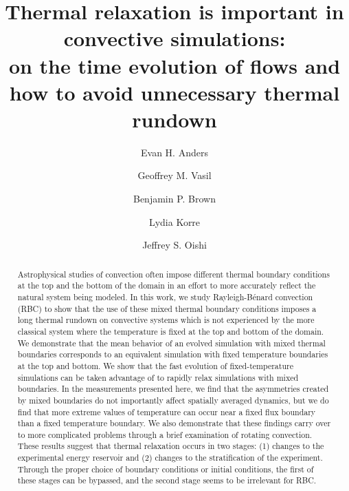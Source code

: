 \documentclass[aps, pre, onecolumn, nofootinbib, notitlepage, groupedaddress, amsfonts, amssymb, amsmath, longbibliography, superscriptaddress]{revtex4-1}
\newcommand{\RB}{Rayleigh-B\'{e}nard }
\begin{document}
\author{Evan H. Anders}
\author{Geoffrey M. Vasil}
\author{Benjamin P. Brown}
\author{Lydia Korre}
\author{Jeffrey S. Oishi}

\title{Thermal relaxation is important in convective simulations: \\
on the time evolution of flows and how to avoid unnecessary thermal rundown}

\begin{abstract}
Astrophysical studies of convection often impose different thermal boundary conditions at the top and the bottom of the domain in an effort to more accurately reflect the natural system being modeled.
In this work, we study \RB convection (RBC) to show that the use of these mixed thermal boundary conditions imposes a long thermal rundown on convective systems which is not experienced by the more classical system where the temperature is fixed at the top and bottom of the domain.
We demonstrate that the mean behavior of an evolved simulation with mixed thermal boundaries corresponds to an equivalent simulation with fixed temperature boundaries at the top and bottom.
We show that the fast evolution of fixed-temperature simulations can be taken advantage of to rapidly relax simulations with mixed boundaries.
In the measurements presented here, we find that the asymmetries created by mixed boundaries do not importantly affect spatially averaged dynamics, but we do find that more extreme values of temperature can occur near a fixed flux boundary than a fixed temperature boundary.
We also demonstrate that these findings carry over to more complicated problems through a brief examination of rotating convection.
These results suggest that thermal relaxation occurs in two stages: (1) changes to the experimental energy reservoir and (2) changes to the stratification of the experiment.
Through the proper choice of boundary conditions or initial conditions, the first of these stages can be bypassed, and the second stage seems to be irrelevant for RBC.
\end{abstract}
\maketitle
\end{document}
